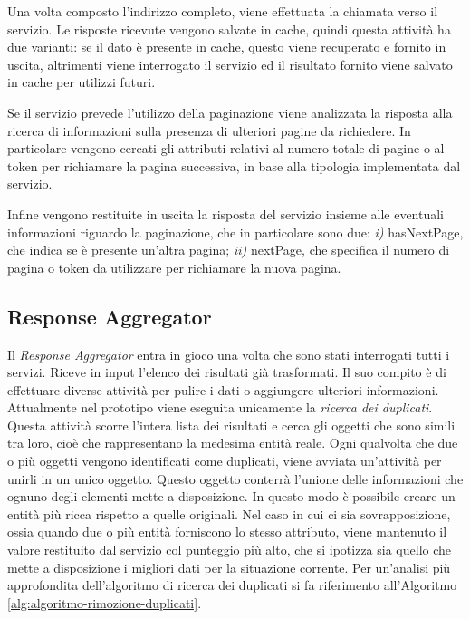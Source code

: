 Una volta composto l'indirizzo completo, viene effettuata la chiamata verso il servizio. Le risposte ricevute vengono salvate in cache, quindi questa attività ha due varianti: se il dato è presente in cache, questo viene recuperato e fornito in uscita, altrimenti viene interrogato il servizio ed il risultato fornito viene salvato in cache per utilizzi futuri.

Se il servizio prevede l'utilizzo della paginazione viene analizzata la risposta alla ricerca di informazioni sulla presenza di ulteriori pagine da richiedere. In particolare vengono cercati gli attributi relativi al numero totale di pagine o al token per richiamare la pagina successiva, in base alla tipologia implementata dal servizio.

Infine vengono restituite in uscita la risposta del servizio insieme alle eventuali informazioni riguardo la paginazione, che in particolare sono due: \emph{i)} hasNextPage, che indica se è presente un'altra pagina; \emph{ii)} nextPage, che specifica il numero di pagina o token da utilizzare per richiamare la nuova pagina.

\subsection{Response Aggregator\label{sec:response-aggregator}}

Il \emph{Response Aggregator} entra in gioco una volta che sono stati interrogati tutti i servizi. Riceve in input l'elenco dei risultati già trasformati. Il suo compito è di effettuare diverse attività per pulire i dati o aggiungere ulteriori informazioni. Attualmente nel prototipo viene eseguita unicamente la \emph{ricerca dei duplicati}. Questa attività scorre l'intera lista dei risultati e cerca gli oggetti che sono simili tra loro, cioè che rappresentano la medesima entità reale. Ogni qualvolta che due o più oggetti vengono identificati come duplicati, viene avviata un'attività per unirli in un unico oggetto. Questo oggetto conterrà l'unione delle informazioni che ognuno degli elementi mette a disposizione. In questo modo è possibile creare un entità più ricca rispetto a quelle originali. Nel caso in cui ci sia sovrapposizione, ossia quando due o più entità forniscono lo stesso attributo, viene mantenuto il valore restituito dal servizio col punteggio più alto, che si ipotizza sia quello che mette a disposizione i migliori dati per la situazione corrente. Per un'analisi più approfondita dell'algoritmo di ricerca dei duplicati si fa riferimento all'Algoritmo \ref{alg:algoritmo-rimozione-duplicati}.

